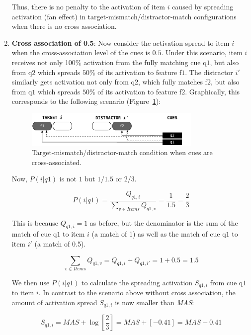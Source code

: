 \documentclass{cambridge7A}\usepackage[]{graphicx}\usepackage[]{color}
\begin{document}
\begin{enumerate}
Thus, there is no penalty to the activation of item $i$ caused by spreading activation (fan effect) in target-mismatch/distractor-match configurations when there is no cross association. 

\item \textbf{Cross association of 0.5}:
Now consider the activation spread to item $i$ when the cross-association level of the cues is $0.5$. Under this scenario, item $i$ receives not only 100\%  activation from the fully matching cue q$1$, but also from q$2$ which spreads $50\%$ of its activation to feature f$1$. The distractor $i'$ similarly gets activation not only from  q$2$, which fully matches  f$2$, but also from  q$1$ which spreads $50\%$ of its activation to feature f$2$.   Graphically, this corresponds to the following scenario (Figure~\ref{fig:implFig2}):

\begin{figure}[htbp]
	\centering
	\includegraphics[width=0.80\textwidth]{figures/implFig2}
	\caption{Target-mismatch/distractor-match condition when cues are cross-associated.}
	\label{fig:implFig2}
\end{figure}

Now, $P(i|q1)$ is not $1$ but $1/1.5$ or $2/3$.  

\begin{equation} \label{eq:newfannoxassoc3}
	P(i|q1) = \frac{Q_{q1,i}}{\sum\limits_{v\in Items} Q_{q1,v}} = \frac{1}{1.5} = \frac{2}{3}
\end{equation}

This is because $Q_{q1,i} = 1$  as before, but the denominator is the sum of the match of cue q$1$ to item $i$ (a match of 1) as well as the match of cue q$1$ to item $i'$ (a match of 0.5).

\begin{equation}
\sum\limits_{v\in Items} Q_{q1,v} = Q_{q1,i} + Q_{q1,i'} = 1 + 0.5 = 1.5
\end{equation}

We then use $P(i|q1)$ to calculate the spreading activation $S_{q1,i}$ from cue q$1$ to item $i$. In contrast to the scenario above without cross association, the amount of activation spread $S_{q1,i}$ is now smaller than \textit{MAS}:

\begin{equation}
S_{q1,i} = \textit{MAS} + \log \left[\frac{2}{3}\right] =  \textit{MAS} + [-0.41] = \textit{MAS} - 0.41
\end{equation}


\end{enumerate}
\end{document}
